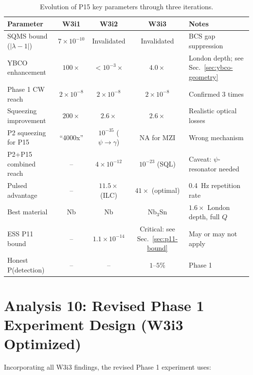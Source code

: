 \documentclass[11pt]{article}
\newcommand{\ee}[1]{\times 10^{#1}}
\newcommand{\lam}{\lambda}
\begin{document}
\begin{table}[H]
\centering
\caption{Evolution of P15 key parameters through three iterations.}
\begin{tabular}{lcccl}
\toprule
Parameter & W3i1 & W3i2 & W3i3 & Notes \\
\midrule
SQMS bound ($|\lam-1|$) & $7\ee{-10}$ & Invalidated & Invalidated & BCS gap suppression \\
YBCO enhancement & $100\times$ & $< 10^{-3}\times$ & $4.0\times$ & London depth; see Sec.~\ref{sec:ybco-geometry} \\
Phase 1 CW reach & $2\ee{-8}$ & $2\ee{-8}$ & $2\ee{-8}$ & Confirmed 3 times \\
Squeezing improvement & $200\times$ & $2.6\times$ & $2.6\times$ & Realistic optical losses \\
P2 squeezing for P15 & ``4000x'' & $10^{-35}$ ($\psi\to\gamma$) & NA for MZI & Wrong mechanism \\
P2+P15 combined reach & -- & $4\ee{-12}$ & $10^{-23}$ (SQL) & Caveat: $\psi$-resonator needed \\
Pulsed advantage & -- & $11.5\times$ (ILC) & $41\times$ (optimal) & 0.4~Hz repetition rate \\
Best material & Nb & Nb & Nb$_3$Sn & $1.6\times$ London depth, full $Q$ \\
ESS P11 bound & -- & $1.1\ee{-14}$ & Critical: see Sec.~\ref{sec:p11-bound} & May or may not apply \\
Honest P(detection) & -- & -- & $1$--$5\%$ & Phase 1 \\
\bottomrule
\end{tabular}
\end{table}

\section{Analysis 10: Revised Phase 1 Experiment Design (W3i3 Optimized)}
\label{sec:revised-design}

Incorporating all W3i3 findings, the revised Phase 1 experiment uses:
\end{document}
